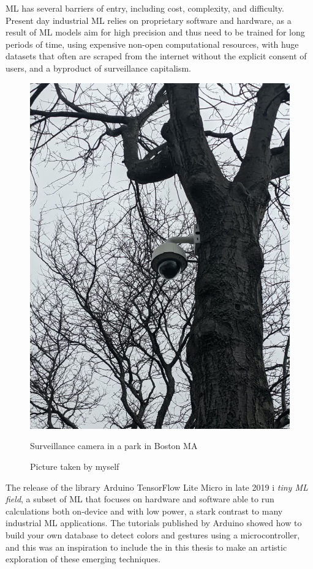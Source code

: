 \acrshort{ML} has several barriers of entry, including cost, complexity, and difficulty. Present day industrial \acrshort{ML} relies on proprietary software and hardware, as a result of \acrshort{ML} models aim for high precision and thus need to be trained for long periods of time, using expensive non-open computational resources, with huge datasets that often are scraped from the internet without the explicit consent of users, and a byproduct of surveillance capitalism.

\begin{figure}[ht]
  \centering
  \includegraphics[width=0.75\linewidth,height=0.30\textheight,keepaspectratio]{images/surveillance-camera-tree.jpg}
  \caption{Surveillance camera in a park in Boston MA}
  \caption*{Picture taken by myself}
  \label{fig:surveillance-camera-tree}
\end{figure}

The release of the library Arduino TensorFlow Lite Micro in late 2019 \cite{google-tensorflow-lite-micro-arduino} i \emph{tiny \acrshort{ML} field}, a subset of \acrshort{ML} that focuses on hardware and software able to run calculations both on-device and with low power, a stark contrast to many industrial \acrshort{ML} applications. The tutorials published by Arduino \cite{arduino-tensorflow-fruit-identification} showed how to build your own database to detect colors and gestures using a microcontroller, and this was an inspiration to include the in this thesis to make an artistic exploration of these emerging techniques.

